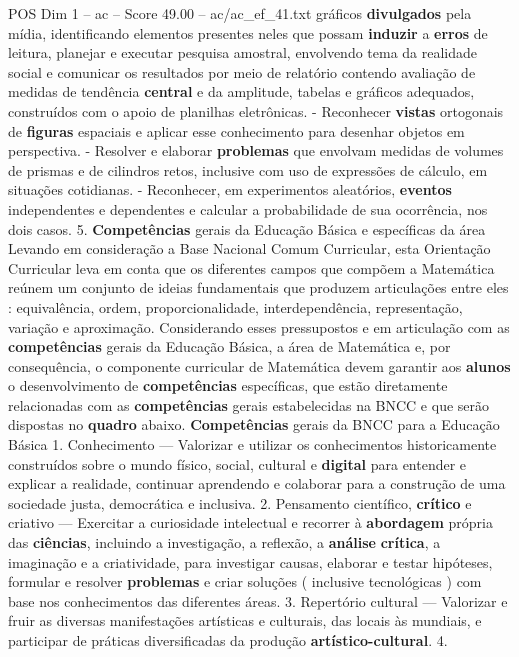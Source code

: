 \begin{textsample}{POS Dim 1 – ac – Score 49.00 – ac/ac\_ef\_41.txt}
gráficos \textbf{divulgados} pela mídia, identificando elementos presentes neles que possam \textbf{induzir} a \textbf{erros} de leitura, planejar e executar pesquisa amostral, envolvendo tema da realidade social e comunicar os resultados por meio de relatório contendo avaliação de medidas de tendência \textbf{central} e da amplitude, tabelas e gráficos adequados, construídos com o apoio de planilhas eletrônicas. - Reconhecer \textbf{vistas} ortogonais de \textbf{figuras} espaciais e aplicar esse conhecimento para desenhar objetos em perspectiva. - Resolver e elaborar \textbf{problemas} que envolvam medidas de volumes de prismas e de cilindros retos, inclusive com uso de expressões de cálculo, em situações cotidianas. - Reconhecer, em experimentos aleatórios, \textbf{eventos} independentes e dependentes e calcular a probabilidade de sua ocorrência, nos dois casos. 5. \textbf{Competências} gerais da Educação Básica e específicas da área Levando em consideração a Base Nacional Comum Curricular, esta Orientação Curricular leva em conta que os diferentes campos que compõem a Matemática reúnem um conjunto de ideias fundamentais que produzem articulações entre eles : equivalência, ordem, proporcionalidade, interdependência, representação, variação e aproximação.
Considerando esses pressupostos e em articulação com as \textbf{competências} gerais da Educação Básica, a área de Matemática e, por consequência, o componente curricular de Matemática devem garantir aos \textbf{alunos} o desenvolvimento de \textbf{competências} específicas, que estão diretamente relacionadas com as \textbf{competências} gerais estabelecidas na BNCC e que serão dispostas no \textbf{quadro} abaixo. \textbf{Competências} gerais da BNCC para a Educação Básica 1.
Conhecimento — Valorizar e utilizar os conhecimentos historicamente construídos sobre o mundo físico, social, cultural e \textbf{digital} para entender e explicar a realidade, continuar aprendendo e colaborar para a construção de uma sociedade justa, democrática e inclusiva. 2.
Pensamento científico, \textbf{crítico} e criativo — Exercitar a curiosidade intelectual e recorrer à \textbf{abordagem} própria das \textbf{ciências}, incluindo a investigação, a reflexão, a \textbf{análise} \textbf{crítica}, a imaginação e a criatividade, para investigar causas, elaborar e testar hipóteses, formular e resolver \textbf{problemas} e criar soluções ( inclusive tecnológicas ) com base nos conhecimentos das diferentes áreas. 3.
Repertório cultural — Valorizar e fruir as diversas manifestações artísticas e culturais, das locais às mundiais, e participar de práticas diversificadas da produção \textbf{artístico-cultural}. 4.

\end{textsample}
